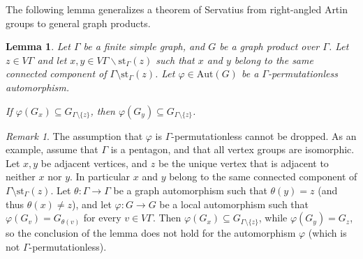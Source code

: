\documentclass[a4paper,english,11pt]{article}
\newtheorem{lemma}[de]{Lemma}
\theoremstyle{definition}
\theoremstyle{remark}
\newtheorem{rk}[de]{Remark}
\newcommand{\st}{\mathrm{st}}
\newcommand{\Aut}{\mathrm{Aut}}
\begin{document}
The following lemma generalizes a theorem of Servatius \cite[Theorem~3]{Ser} from right-angled Artin groups to general graph products.

\begin{lemma}\label{lemma:cg}
Let $\Gamma$ be a finite simple graph, and $G$ be a graph product over $\Gamma$. Let $z\in V\Gamma$ and let $x,y\in V\Gamma\backslash \st_{\Gamma}(z)$ such that $x$ and $y$ belong to the same connected component of $\Gamma\setminus\st_\Gamma(z)$. Let $\varphi\in\Aut(G)$ be a $\Gamma$-permutationless automorphism.

If $\varphi(G_x)\subseteq G_{\Gamma\setminus\{z\}}$, then $\varphi(G_y)\subseteq G_{\Gamma\setminus\{z\}}$.
\end{lemma}

\begin{rk}
The assumption that $\varphi$ is $\Gamma$-permutationless cannot be dropped. As an example, assume that $\Gamma$ is a pentagon, and that all vertex groups are isomorphic. Let $x,y$ be adjacent vertices, and $z$ be the unique vertex that is adjacent to neither $x$ nor $y$. In particular $x$ and $y$ belong to the same connected component of $\Gamma\setminus\st_\Gamma(z)$. Let $\theta:\Gamma\to\Gamma$ be a graph automorphism such that $\theta(y)=z$ (and thus $\theta(x)\neq z$), and let $\varphi:G\to G$ be a local automorphism such that $\varphi(G_v)=G_{\theta(v)}$ for every $v\in V\Gamma$. Then $\varphi(G_x)\subseteq G_{\Gamma\setminus\{z\}}$, while $\varphi(G_y)=G_z$, so the conclusion of the lemma does not hold for the automorphism $\varphi$ (which is not $\Gamma$-permutationless). 
\end{rk}
\end{document}
